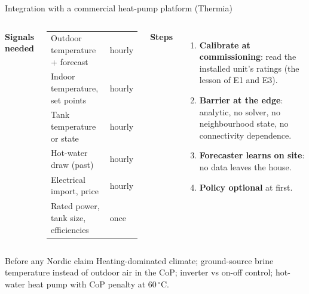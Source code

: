 \documentclass[aspectratio=169,10pt]{beamer}
\begin{document}
\begin{frame}{Integration with a commercial heat-pump platform (Thermia)}
\begin{columns}[T]
\textbf{Signals needed}
\small
\begin{tabular}{@{}ll@{}}
\toprule
Outdoor temperature + forecast & hourly \\
Indoor temperature, set points & hourly \\
Tank temperature or state & hourly \\
Hot-water draw (past) & hourly \\
Electrical import, price & hourly \\
Rated power, tank size, efficiencies & once \\
\bottomrule
\end{tabular}
\textbf{Steps}
\begin{enumerate}
  \item \textbf{Calibrate at commissioning}: read the installed unit's ratings (the lesson of E1 and E3).
  \item \textbf{Barrier at the edge}: analytic, no solver, no neighbourhood state, no connectivity dependence.
  \item \textbf{Forecaster learns on site}: no data leaves the house.
  \item \textbf{Policy optional} at first.
\end{enumerate}
\end{columns}
\vspace{0.4em}
\begin{alertblock}{Before any Nordic claim}
Heating-dominated climate; ground-source brine temperature instead of outdoor air in the CoP; inverter vs on-off control; hot-water heat pump with CoP penalty at 60\,$^\circ$C.
\end{alertblock}
\end{frame}
\end{document}
